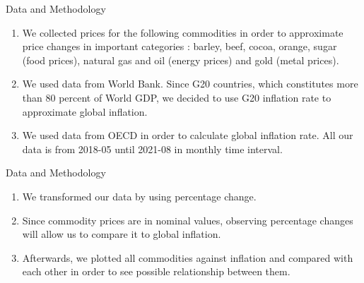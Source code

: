 \begin{frame}{Data and Methodology}
   \begin{enumerate}
            \item We collected prices for the following commodities in order to approximate price changes in important categories : barley, beef, cocoa, orange, sugar (food prices), natural gas and oil (energy
prices) and gold (metal prices).
            \item We used data from World Bank. Since G20 countries, which
constitutes more than 80 percent of World GDP, we decided to use G20 inflation rate to approximate global inflation. 
            \item We used data from OECD in order to calculate global inflation rate. All
our data is from 2018-05 until 2021-08 in monthly time interval.
        \end{enumerate}
\end{frame}

\begin{frame}{Data and Methodology}
    \begin{enumerate}
            \item We transformed our data by using percentage change.
            \item Since commodity prices are in nominal
values, observing percentage changes will allow us to compare it to global inflation.
            \item Afterwards,
we plotted all commodities against inflation and compared with each other in order to see possible
relationship between them.   
        \end{enumerate}
\end{frame}